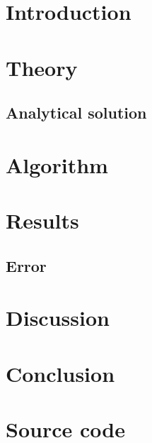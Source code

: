 \documentclass[a4paper, 12pt, english]{article}
\author{Kristoffer Brækken, Vedad Hodzic, Paul Magnus Sørensen-Clark}
\begin{document}
\begin{titlepage}
    \thispagestyle{empty}
    
\end{titlepage}

\begin{abstract}
	
\end{abstract}

\section{Introduction}


\section{Theory}

\subsection{Analytical solution}


\section{Algorithm}


\section{Results}


\subsection{Error}


\section{Discussion}




\section{Conclusion}


\section{Source code}

\end{document}
